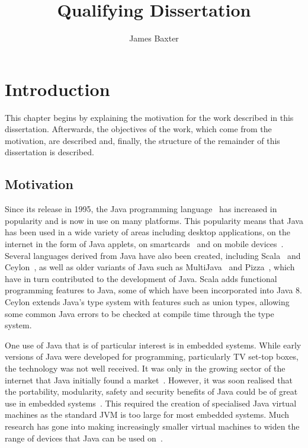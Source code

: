 \documentclass[a4paper,10pt]{report}
\title{Qualifying Dissertation}
\author{James Baxter}
\date{}
\begin{document}
\maketitle


\tableofcontents

\chapter{Introduction}

This chapter begins by explaining the motivation for the work described in this
dissertation. Afterwards, the objectives of the work, which come from the
motivation, are described and, finally, the structure of the remainder of this
dissertation is described.

\section{Motivation}

Since its release in 1995, the Java programming language~\cite{gosling2013} has
increased in popularity and is now in use on many platforms.  This popularity
means that Java has been used in a wide variety of areas including desktop
applications, on the internet in the form of Java applets, on
smartcards~\cite{chen2000} and on mobile devices~\cite{oracle2014}.  Several
languages derived from Java have also been created, including
Scala~\cite{lausanne2015} and Ceylon~\cite{redhat2015}, as well as older
variants of Java such as MultiJava~\cite{clifton2006} and
Pizza~\cite{odersky1997}, which have in turn contributed to the development of
Java. Scala adds functional programming features to Java, some of which have
been incorporated into Java 8. Ceylon extends Java's type system with features
such as union types, allowing some common Java errors to be checked at compile
time through the type system.

One use of Java that is of particular interest is in embedded systems.  While
early versions of Java were developed for programming, particularly TV set-top
boxes, the technology was not well received. It was only in the growing sector
of the internet that Java initially found a market~\cite{horstmann2002}.
However, it was soon realised that the portability, modularity, safety and
security benefits of Java could be of great use in embedded
systems~\cite{mulchandani1998}.  This required the creation of specialised Java
virtual machines as the standard JVM is too large for most embedded systems.
Much research has gone into making increasingly smaller virtual machines to
widen the range of devices that Java can be used on~\cite{caska2011,thomm2010}.
\end{document}
